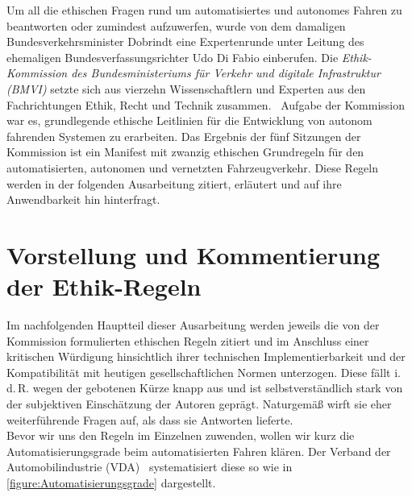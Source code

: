 \documentclass[twoside,a4paper,12pt]{article}
\begin{document}
Um all die ethischen Fragen rund um automatisiertes und autonomes Fahren zu beantworten oder zumindest aufzuwerfen, wurde von dem damaligen Bundesverkehrsminister Dobrindt eine Expertenrunde unter Leitung des ehemaligen Bundesverfassungsrichter Udo Di Fabio einberufen. Die \textit{Ethik-Kommission
des Bundesministeriums für Verkehr und digitale Infrastruktur (BMVI)} setzte sich aus vierzehn Wissenschaftlern und Experten aus den Fachrichtungen Ethik, Recht und Technik zusammen.~\cite{bmvi1} Aufgabe der Kommission war es, grundlegende ethische Leitlinien für die Entwicklung von autonom fahrenden Systemen zu
erarbeiten. Das Ergebnis der fünf Sitzungen der Kommission ist ein Manifest mit zwanzig ethischen Grundregeln für den automatisierten, autonomen und vernetzten Fahrzeugverkehr. Diese Regeln werden in der folgenden Ausarbeitung zitiert, erläutert und auf ihre Anwendbarkeit hin hinterfragt. 

\newpage

\tableofcontents


\listoffigures

\newpage

\mainmatter

\cleardoublepage
\section{Vorstellung und Kommentierung der Ethik-Regeln} \label{VorstellungUndKommentierungDerEthikRegeln}

Im nachfolgenden Hauptteil dieser Ausarbeitung werden jeweils die von der Kommission formulierten ethischen Regeln zitiert und im Anschluss einer kritischen 
Würdigung hinsichtlich ihrer technischen Implementierbarkeit und der Kompatibilität mit heutigen gesellschaftlichen Normen unterzogen. 
Diese fällt i.\,d.\,R. wegen der gebotenen Kürze knapp aus und ist selbstverständlich
stark von der subjektiven Einschätzung der Autoren geprägt. Naturgemäß wirft sie eher weiterführende Fragen auf, als dass sie Antworten lieferte.\\

Bevor wir uns den Regeln im Einzelnen zuwenden, wollen wir kurz die Automatisierungsgrade beim automatisierten Fahren klären. Der Verband der 
Automobilindustrie (VDA)~\cite{vda} systematisiert diese so wie in \autoref{figure:Automatisierungsgrade} dargestellt.\\
\end{document}
